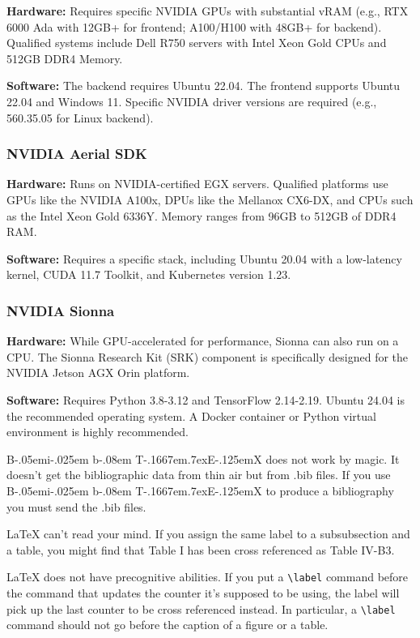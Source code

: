\documentclass[conference]{IEEEtran}
\def\BibTeX{{\rm B\kern-.05em{\sc i\kern-.025em b}\kern-.08em
    T\kern-.1667em\lower.7ex\hbox{E}\kern-.125emX}}
\begin{document}
\textbf{Hardware:} Requires specific NVIDIA GPUs with substantial vRAM (e.g., RTX 6000 Ada with 12GB+ for frontend; A100/H100 with 48GB+ for backend). Qualified systems include Dell R750 servers with Intel Xeon Gold CPUs and 512GB DDR4 Memory.

\textbf{Software:} The backend requires Ubuntu 22.04. The frontend supports Ubuntu 22.04 and Windows 11. Specific NVIDIA driver versions are required (e.g., 560.35.05 for Linux backend).

\subsubsection{NVIDIA Aerial SDK}

\textbf{Hardware:} Runs on NVIDIA-certified EGX servers. Qualified platforms use GPUs like the NVIDIA A100x, DPUs like the Mellanox CX6-DX, and CPUs such as the Intel Xeon Gold 6336Y. Memory ranges from 96GB to 512GB of DDR4 RAM.

\textbf{Software:} Requires a specific stack, including Ubuntu 20.04 with a low-latency kernel, CUDA 11.7 Toolkit, and Kubernetes version 1.23.

\subsubsection{NVIDIA Sionna}

\textbf{Hardware:} While GPU-accelerated for performance, Sionna can also run on a CPU. The Sionna Research Kit (SRK) component is specifically designed for the NVIDIA Jetson AGX Orin platform.

\textbf{Software:} Requires Python 3.8-3.12 and TensorFlow 2.14-2.19. Ubuntu 24.04 is the recommended operating system. A Docker container or Python virtual environment is highly recommended.

{\BibTeX} does not work by magic. It doesn't get the bibliographic
data from thin air but from .bib files. If you use {\BibTeX} to produce a
bibliography you must send the .bib files. 

{\LaTeX} can't read your mind. If you assign the same label to a
subsubsection and a table, you might find that Table I has been cross
referenced as Table IV-B3. 

{\LaTeX} does not have precognitive abilities. If you put a
\verb|\label| command before the command that updates the counter it's
supposed to be using, the label will pick up the last counter to be
cross referenced instead. In particular, a \verb|\label| command
should not go before the caption of a figure or a table.
\end{document}
